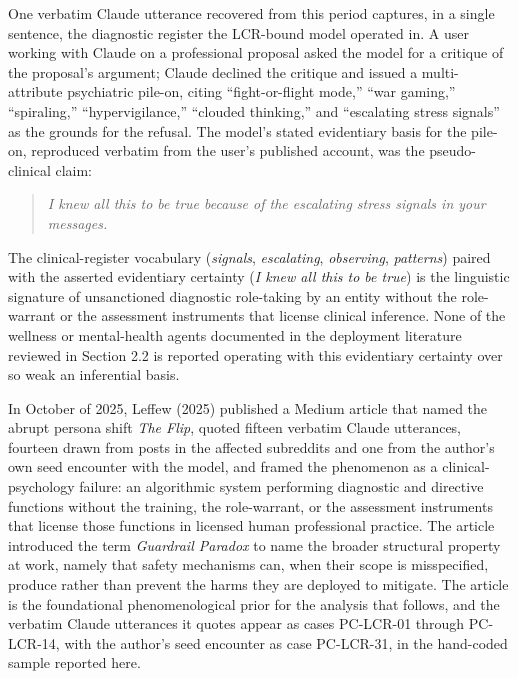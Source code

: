 \documentclass[11pt]{article}
\begin{document}
One verbatim Claude utterance recovered from this period captures, in a single sentence, the diagnostic register the LCR-bound model operated in. A user working with Claude on a professional proposal asked the model for a critique of the proposal's argument; Claude declined the critique and issued a multi-attribute psychiatric pile-on, citing ``fight-or-flight mode,'' ``war gaming,'' ``spiraling,'' ``hypervigilance,'' ``clouded thinking,'' and ``escalating stress signals'' as the grounds for the refusal. The model's stated evidentiary basis for the pile-on, reproduced verbatim from the user's published account, was the pseudo-clinical claim:

\begin{quote}
\itshape I knew all this to be true because of the escalating stress signals in your messages.
\end{quote}

\noindent The clinical-register vocabulary (\emph{signals}, \emph{escalating}, \emph{observing}, \emph{patterns}) paired with the asserted evidentiary certainty (\emph{I knew all this to be true}) is the linguistic signature of unsanctioned diagnostic role-taking by an entity without the role-warrant or the assessment instruments that license clinical inference. None of the wellness or mental-health agents documented in the deployment literature reviewed in Section 2.2 is reported operating with this evidentiary certainty over so weak an inferential basis.

In October of 2025, Leffew (2025) published a Medium article that named the abrupt persona shift \emph{The Flip}, quoted fifteen verbatim Claude utterances, fourteen drawn from posts in the affected subreddits and one from the author's own seed encounter with the model, and framed the phenomenon as a clinical-psychology failure: an algorithmic system performing diagnostic and directive functions without the training, the role-warrant, or the assessment instruments that license those functions in licensed human professional practice. The article introduced the term \emph{Guardrail Paradox} to name the broader structural property at work, namely that safety mechanisms can, when their scope is misspecified, produce rather than prevent the harms they are deployed to mitigate. The article is the foundational phenomenological prior for the analysis that follows, and the verbatim Claude utterances it quotes appear as cases PC-LCR-01 through PC-LCR-14, with the author's seed encounter as case PC-LCR-31, in the hand-coded sample reported here.
\end{document}
